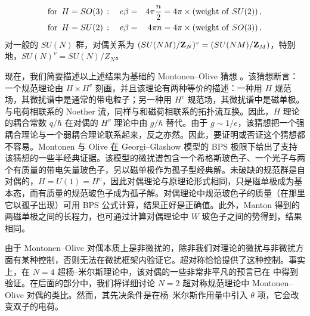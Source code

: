 \begin{eqnarray}
{\rm for}\,\,\,H=SO(3)\,:\quad e\beta &=& 4\pi \frac{n}{2}=4\pi \times 
({\rm weight \,\,of\,\,} SU(2))\,, \nonumber\\ 
{\rm for}\,\,\,H=SU(2)\,:\quad e\beta &=& 4\pi n = 4\pi \times 
({\rm weight\,\,of\,\,}SO(3))\,. \nonumber
\end{eqnarray}
对一般的 $SU(N)$ 群，对偶关系为 $(SU(NM)/{\bf Z}_N)^v = (SU(NM)/{\bf Z}_M)$，特别地，$SU(N)^v = SU(N)/Z_N$。

现在，我们简要描述以上述结果为基础的 Montonen–Olive 猜想 \cite{MO}。该猜想断言：一个规范理论由 $H \times H^{v}$ 刻画，并且该理论有两种等价的描述：一种用 $H$ 规范场，其微扰谱中是通常的带电粒子；另一种用 $H^{v}$ 规范场，其微扰谱中是磁单极。与电荷相联系的 Noether 流，同样与和磁荷相联系的拓扑流互换。因此，$H$ 理论的耦合常数 $q/\hbar$ 在对偶的 $H^v$ 理论中由 $g/\hbar$ 替代。由于 $g\sim 1/e$，该猜想把一个强耦合理论与一个弱耦合理论联系起来，反之亦然。因此，要证明或否证这个猜想都不容易。Montonen 与 Olive 在 Georgi–Glashow 模型的 BPS 极限下给出了支持该猜想的一些半经典证据。该模型的微扰谱包含一个希格斯玻色子、一个光子与两个有质量的带电矢量玻色子，另以磁单极作为孤子型经典解。未破缺的规范群是自对偶的，$H=U(1)=H^v$，因此对偶理论与原理论形式相同，只是磁单极成为基本态，而有质量的规范玻色子成为孤子解。对偶理论中规范玻色子的质量（在那里它以孤子出现）可用 BPS 公式计算，结果正好是正确值。此外，Manton \cite{manton} 得到的两磁单极之间的长程力，也可通过计算对偶理论中 $W$ 玻色子之间的势得到，结果相同。

由于 Montonen–Olive 对偶本质上是非微扰的，除非我们对理论的微扰与非微扰方面有某种控制，否则无法在微扰框架内验证它。超对称恰恰提供了这种控制。事实上，在 $N=4$ 超杨–米尔斯理论中，该对偶的一些非常非平凡的预言已在 \cite{sen} 中得到验证。在后面的部分中，我们将详细讨论 $N=2$ 超对称规范理论中 Montonen–Olive 对偶的类比。然而，其先决条件是在杨–米尔斯作用量中引入 $\theta$ 项，它会改变双子的电荷。

